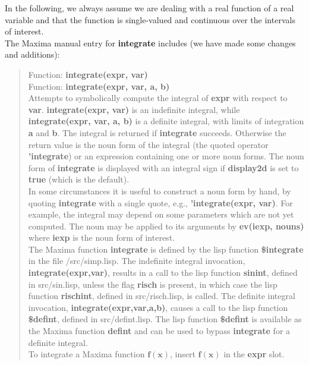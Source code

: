\documentclass[12pt]{article}
\begin{document}
\noindent In the following, we always assume we are dealing with a real function of a real variable
  and that the function is single-valued and continuous over the intervals of interest.\\

\noindent The Maxima manual entry for \textbf{integrate} includes
  (we have made some changes and additions):
\small
\begin{quote}
Function: \textbf{integrate(expr, var)} \\
Function: \textbf{integrate(expr, var, a, b)}\\ 
Attempts to symbolically compute the integral of \textbf{expr} with respect to \textbf{var}.
   \textbf{integrate(expr, var)} is an indefinite integral, 
   while \textbf{integrate(expr, var, a, b)} is a definite integral,
   with limits of integration \textbf{a} and \textbf{b}.
The integral  is returned if \textbf{integrate} succeeds.
Otherwise the return value is the noun form of the integral (the quoted operator \textbf{'integrate})
   or an expression containing one or more noun forms.
The noun form of \textbf{integrate} is displayed with an integral sign if \textbf{display2d} is
  set to \textbf{true} (which is the default).\\

In some circumstances it is useful to construct a noun form by hand, by quoting \textbf{integrate}
   with a single quote, e.g., \textbf{'integrate(expr, var)}.
For example, the integral may depend on some parameters which are not yet computed.
The noun may be applied to its arguments by \textbf{ev(iexp, nouns)} where \textbf{iexp}
 is the noun form of interest. \\
 

The Maxima function \textbf{integrate} is defined by the lisp 
  function \textbf{\$integrate} in the file /src/simp.lisp.
The indefinite integral invocation, \textbf{integrate(expr,var)}, results in a call to the lisp
  function \textbf{sinint}, defined in src/sin.lisp, unless the flag \textbf{risch} is present,
  in which case the lisp function \textbf{rischint}, defined in src/risch.lisp, is called.
The definite integral invocation, \textbf{integrate(expr,var,a,b)},
 causes a call to the lisp function \textbf{\$defint}, defined in src/defint.lisp.
 The lisp function \textbf{\$defint} is available as the Maxima function \textbf{defint} and
  can be used to bypass \textbf{integrate} for a definite integral.\\  

To integrate a Maxima function $\mathbf{f(x)}$, insert $\mathbf{f(x)}$ in
 the \textbf{expr} slot.\\


\end{quote}
\end{document}
